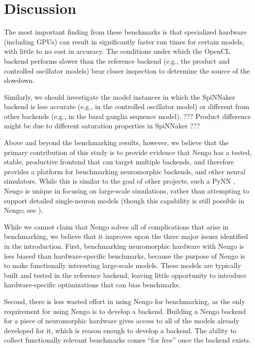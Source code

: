 \documentclass{frontiersSCNS}
\begin{document}
\section{Discussion}

The most important finding from these benchmarks
is that specialized hardware (including GPUs)
can result in significantly faster run times
for certain models,
with little to no cost in accuracy.
The conditions under which the OpenCL backend
performs slower than the reference backend
(e.g., the product and controlled oscillator models)
bear closer inspection to determine the source
of the slowdown.

Similarly, we should investigate
the model instances in which the SpiNNaker backend
is less accurate (e.g., in the controlled oscillator model)
or different from other backends
(e.g., in the basal ganglia sequence model).
??? Product difference might be due to different saturation
properties in SpiNNaker ???

Above and beyond the benchmarking results,
however, we believe that the primary contribution
of this study is to provide evidence that Nengo
has a tested, stable, productive frontend
that can target multiple backends,
and therefore provides a platform
for benchmarking neuromorphic backends,
and other neural simulators.
While this is similar to the goal
of other projects, such a PyNN \cite{???},
Nengo is unique in focusing on large-scale simulations,
rather than attempting to support
detailed single-neuron models
(though this capability is still possible in Nengo;
see \cite{???}).

While we cannot claim that Nengo
solves all of complications that arise
in benchmarking,
we believe that it improves upon
the three major issues identified in the introduction.
First, benchmarking neuromorphic hardware
with Nengo is less biased than
hardware-specific benchmarks,
because the purpose of Nengo is
to make functionally interesting large-scale models.
These models are typically built and tested
in the reference backend,
leaving little opportunity to introduce
hardware-specific optimizations
that can bias benchmarks.

Second, there is less wasted effort
in using Nengo for benchmarking,
as the only requirement for using
Nengo is to develop a backend.
Building a Nengo backend for
a piece of neuromorphic hardware
gives access to all of the models
already developed for it,
which is reason enough to develop a backend.
The ability to collect functionally relevant benchmarks
comes ``for free'' once the backend exists.
\end{document}
